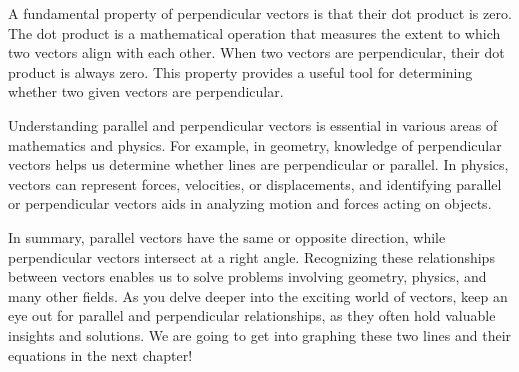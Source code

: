 A fundamental property of perpendicular vectors is that their dot
product is zero. The dot product is a mathematical operation that
measures the extent to which two vectors align with each other. When
two vectors are perpendicular, their dot product is always zero. This
property provides a useful tool for determining whether two given
vectors are perpendicular.

Understanding parallel and perpendicular vectors is essential in
various areas of mathematics and physics. For example, in geometry,
knowledge of perpendicular vectors helps us determine whether lines
are perpendicular or parallel. In physics, vectors can represent
forces, velocities, or displacements, and identifying parallel or
perpendicular vectors aids in analyzing motion and forces acting on
objects.

In summary, parallel vectors have the same or opposite direction,
while perpendicular vectors intersect at a right angle. Recognizing
these relationships between vectors enables us to solve problems
involving geometry, physics, and many other fields. As you delve
deeper into the exciting world of vectors, keep an eye out for
parallel and perpendicular relationships, as they often hold valuable
insights and solutions. We are going to get into graphing these two lines
and their equations in the next chapter!

